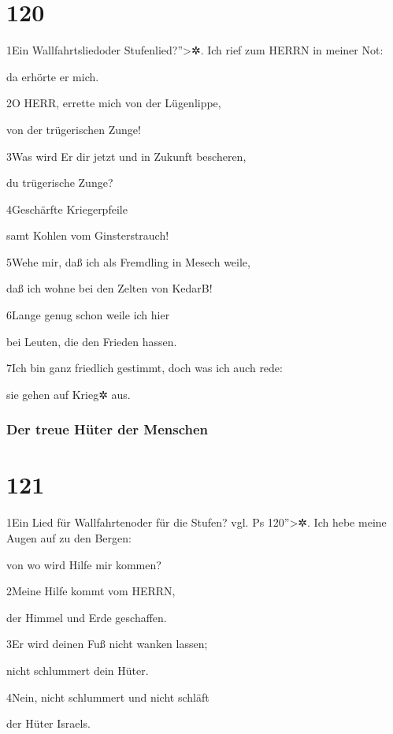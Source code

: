 \hypertarget{section-119}{%
\section{120}\label{section-119}}

1Ein Wallfahrtsliedoder Stufenlied?''\textgreater✲. Ich rief zum HERRN
in meiner Not:

da erhörte er mich.

2O HERR, errette mich von der Lügenlippe,

von der trügerischen Zunge!

3Was wird Er dir jetzt und in Zukunft bescheren,

du trügerische Zunge?

4Geschärfte Kriegerpfeile

samt Kohlen vom Ginsterstrauch!

5Wehe mir, daß ich als Fremdling in Mesech weile,

daß ich wohne bei den Zelten von Kedar{B}!

6Lange genug schon weile ich hier

bei Leuten, die den Frieden hassen.

7Ich bin ganz friedlich gestimmt, doch was ich auch rede:

sie gehen auf Krieg✲ aus.

\hypertarget{der-treue-huxfcter-der-menschen}{%
\subsubsection{Der treue Hüter der
Menschen}\label{der-treue-huxfcter-der-menschen}}

\hypertarget{section-120}{%
\section{121}\label{section-120}}

1Ein Lied für Wallfahrtenoder für die Stufen? vgl. Ps
120''\textgreater✲. Ich hebe meine Augen auf zu den Bergen:

von wo wird Hilfe mir kommen?

2Meine Hilfe kommt vom HERRN,

der Himmel und Erde geschaffen.

3Er wird deinen Fuß nicht wanken lassen;

nicht schlummert dein Hüter.

4Nein, nicht schlummert und nicht schläft

der Hüter Israels.

